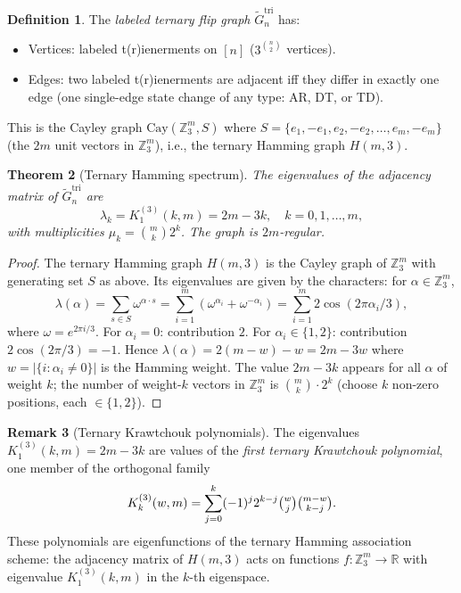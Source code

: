 \documentclass[12pt,reqno]{amsart}
\newtheorem{theorem}{Theorem}[section]
\theoremstyle{definition}
\newtheorem{definition}[theorem]{Definition}
\newtheorem{remark}[theorem]{Remark}
\theoremstyle{plain}
\begin{document}
\begin{definition}
The \emph{labeled ternary flip graph} $\tilde{G}_n^{\mathrm{tri}}$ has:
\begin{itemize}
\item Vertices: labeled t(r)ienerments on $[n]$ ($3^{\binom{n}{2}}$ vertices).
\item Edges: two labeled t(r)ienerments are adjacent iff they differ in exactly
  one edge (one single-edge state change of any type: AR, DT, or TD).
\end{itemize}
This is the Cayley graph $\mathrm{Cay}(\mathbb{Z}_3^m, S)$ where
$S=\{e_1,-e_1,e_2,-e_2,\ldots,e_m,-e_m\}$ (the $2m$ unit vectors in $\mathbb{Z}_3^m$),
i.e., the ternary Hamming graph $H(m,3)$.
\end{definition}

\begin{theorem}[Ternary Hamming spectrum]\label{thm:ternary-spectrum}
The eigenvalues of the adjacency matrix of $\tilde{G}_n^{\mathrm{tri}}$ are
\[
  \lambda_k = K_1^{(3)}(k,m) = 2m-3k,\quad k=0,1,\ldots,m,
\]
with multiplicities $\mu_k=\binom{m}{k}2^k$.  The graph is $2m$-regular.
\end{theorem}

\begin{proof}
The ternary Hamming graph $H(m,3)$ is the Cayley graph of $\mathbb{Z}_3^m$ with
generating set $S$ as above.  Its eigenvalues are given by the characters:
for $\alpha\in\mathbb{Z}_3^m$,
\[
  \lambda(\alpha)=\sum_{s\in S}\omega^{\alpha\cdot s}
  =\sum_{i=1}^m(\omega^{\alpha_i}+\omega^{-\alpha_i})
  =\sum_{i=1}^m 2\cos(2\pi\alpha_i/3),
\]
where $\omega=e^{2\pi i/3}$.  For $\alpha_i=0$: contribution $2$.
For $\alpha_i\in\{1,2\}$: contribution $2\cos(2\pi/3)=-1$.
Hence $\lambda(\alpha)=2(m-w)-w=2m-3w$ where $w=|\{i:\alpha_i\ne 0\}|$
is the Hamming weight.  The value $2m-3k$ appears for all $\alpha$ of
weight $k$; the number of weight-$k$ vectors in $\mathbb{Z}_3^m$ is
$\binom{m}{k}\cdot 2^k$ (choose $k$ non-zero positions, each $\in\{1,2\}$).
\end{proof}

\begin{remark}[Ternary Krawtchouk polynomials]
The eigenvalues $K_1^{(3)}(k,m)=2m-3k$ are values of the \emph{first ternary
Krawtchouk polynomial}, one member of the orthogonal family
\[
  K_k^{(3)}(w,m)=\sum_{j=0}^k(-1)^j 2^{k-j}\tbinom{w}{j}\tbinom{m-w}{k-j}.
\]
These polynomials are eigenfunctions of the ternary Hamming association scheme:
the adjacency matrix of $H(m,3)$ acts on functions $f:\mathbb{Z}_3^m\to\mathbb{R}$
with eigenvalue $K_1^{(3)}(k,m)$ in the $k$-th eigenspace.
\end{remark}
\end{document}
